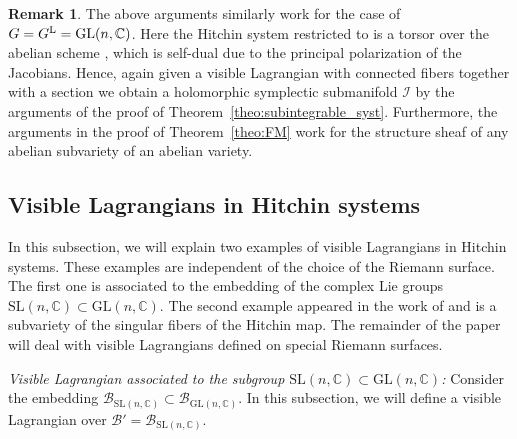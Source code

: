 \documentclass[pdftex]{sigma}
\numberwithin{equation}{section}
\theoremstyle{definition}
\newtheorem{rema}[theo]{Remark}
\newcommand{\reg}{\mathrm{reg}}
\newcommand{\Jac}{\mathrm{Jac}}
\renewcommand{\to}{\rightarrow}
\newcommand{\calB}{\mathcal{B}}
\newcommand{\calI}{\mathcal{I}}
\newcommand{\CC}{\mathbb{C}}
\newcommand{\GL}{\mathrm{GL}}
\newcommand{\SL}{\mathrm{SL}}
\begin{document}
\begin{rema}\label{rema:GL} The above arguments similarly work for the case of $G=G^{\rm L}=\GL(n,\CC)$. Here the Hitchin system restricted to \smash{$\calB_{\GL(n,\CC)}^{\reg}$} is a torsor over the abelian scheme \smash{$\Jac(\Sigma) \to \calB_{\GL(n,\CC)}^{\reg}$}, which is self-dual due to the principal polarization of the Jacobians. Hence, again given a visible Lagrangian with connected fibers together with a section we obtain a holomorphic symplectic submanifold $\calI$ by the arguments of the proof of Theorem~\ref{theo:subintegrable_syst}. Furthermore, the arguments in the proof of Theorem~\ref{theo:FM} work for the structure sheaf of any abelian subvariety of an abelian variety.
\end{rema}

\subsection{Visible Lagrangians in Hitchin systems}\label{sec:visi_Lagra_Hitchin}
In this subsection, we will explain two examples of visible Lagrangians in Hitchin systems. These examples are independent of the choice of the Riemann surface. The first one is associated to the embedding of the complex Lie groups $\SL(n,\CC) \subset \GL(n,\CC)$. The second example appeared in the work of \cite{FGOP} and is a subvariety of the singular fibers of the Hitchin map. The remainder of the paper will deal with visible Lagrangians defined on special Riemann surfaces.

\textit{Visible Lagrangian associated to the subgroup $\SL(n,\CC) \subset \GL(n,\CC)$:}
Consider the embedding $\calB_{\SL(n,\CC)} \subset \calB_{\GL(n,\CC)}$. In this subsection, we will define a visible Lagrangian over $\calB'=\calB_{\SL(n,\CC)}$.
\end{document}
